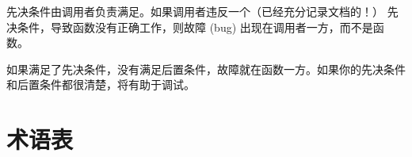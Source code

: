 先决条件由调用者负责满足。如果调用者违反一个（已经充分记录文档的！）
先决条件，导致函数没有正确工作，则故障 (bug) 出现在调用者一方，而不是函数。


如果满足了先决条件，没有满足后置条件，故障就在函数一方。如果你的先决条件和后置条件都很清楚，将有助于调试。


\section{术语表}

